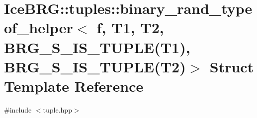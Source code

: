 \hypertarget{structIceBRG_1_1tuples_1_1binary__rand__typeof__helper_3_01f_00_01T1_00_01T2_00_01BRG__S__IS__TU17fb7ccd40b5d61da5648c1c2c034d10}{}\section{Ice\+B\+R\+G\+:\+:tuples\+:\+:binary\+\_\+rand\+\_\+typeof\+\_\+helper$<$ f, T1, T2, B\+R\+G\+\_\+\+S\+\_\+\+I\+S\+\_\+\+T\+U\+P\+L\+E(T1), B\+R\+G\+\_\+\+S\+\_\+\+I\+S\+\_\+\+T\+U\+P\+L\+E(T2)$>$ Struct Template Reference}
\label{structIceBRG_1_1tuples_1_1binary__rand__typeof__helper_3_01f_00_01T1_00_01T2_00_01BRG__S__IS__TU17fb7ccd40b5d61da5648c1c2c034d10}


{\ttfamily \#include $<$tuple.\+hpp$>$}

